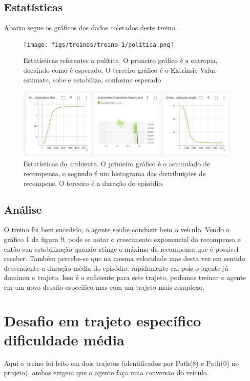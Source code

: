 \subsection*{Estatísticas}

Abaixo segue os gráficos dos dados coletados deste treino. 

\begin{figure}[h]
    \centering
    \texttt{[image: figs/treinos/treino-1/política.png]}
     \caption{Estatísticas referentes a política. O primeiro gráfico é a entropia, decaindo como é esperado. O terceiro gráfico é o Extrinsic Value estimate, sobe e estabiliza, conforme esperado}
     \label{fig:treino-1-politica}
\end{figure}

\begin{figure}[h]
    \centering
    \includegraphics[scale=0.35]{figs/treinos/treino-1/ambiente.png}
     \caption{Estatísticas do ambiente. O primeiro gráfico é o acumulado de recompensa, o segundo é um histograma das distribuições de recompens. O terceiro é a duração do episódio.}
     \label{fig:treino-1-ambiente}
\end{figure}

\subsection*{Análise}
O treino foi bem sucedido, o agente soube conduzir bem o veículo. Vendo o gráfico 1 da figura 9, pode se notar o crescimento exponencial da recompensa e então sua estabilização quando atinge o máximo da recompensa que é possível receber. Também percebe-se que na mesma velocidade mas desta vez em sentido descendente a duração média do episódio, rapidamente cai pois o agente já dominou o trajeto. Isso é o suficiente para este trajeto, podemos treinar o agente em um novo desafio especifíco mas com um trajeto mais complexo.

\section{Desafio em trajeto específico dificuldade média}
Aqui o treino foi feito em dois trajetos (identificados por Path(8) e Path(0) no projeto), ambos exigem que o agente faça uma conversão do veículo.

